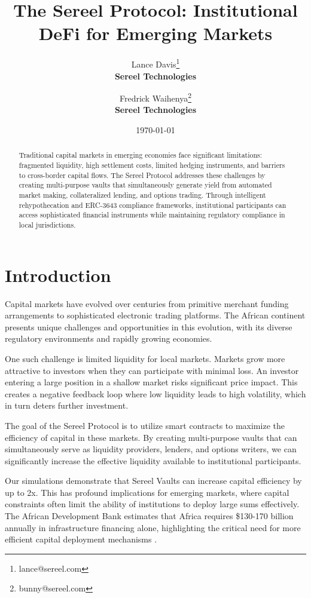 \documentclass[12pt]{article}
\title{The Sereel Protocol: Institutional DeFi for Emerging Markets}
\author{
Lance Davis\thanks{lance@sereel.com} \\ 
\textbf{\small Sereel Technologies}
\and
Fredrick Waihenya\thanks{bunny@sereel.com} \\
\textbf{\small Sereel Technologies}
}
\date{\today}
\begin{document}
\maketitle

\begin{abstract}
Traditional capital markets in emerging economies face significant limitations: fragmented liquidity, high settlement costs, limited hedging instruments, and barriers to cross-border capital flows. The Sereel Protocol addresses these challenges by creating multi-purpose vaults that simultaneously generate yield from automated market making, collateralized lending, and options trading. Through intelligent rehypothecation and ERC-3643 compliance frameworks, institutional participants can access sophisticated financial instruments while maintaining regulatory compliance in local jurisdictions.
\end{abstract}

\section{Introduction}

Capital markets have evolved over centuries from primitive merchant funding arrangements to sophisticated electronic trading platforms. The African continent presents unique challenges and opportunities in this evolution, with its diverse regulatory environments and rapidly growing economies.

One such challenge is limited liquidity for local markets. Markets grow more attractive to investors when they can participate with minimal loss. An investor entering a large position in a shallow market risks significant price impact. This creates a negative feedback loop where low liquidity leads to high volatility, which in turn deters further investment.

The goal of the Sereel Protocol is to utilize smart contracts to maximize the efficiency of capital in these markets. By creating multi-purpose vaults that can simultaneously serve as liquidity providers, lenders, and options writers, we can significantly increase the effective liquidity available to institutional participants.

Our simulations demonstrate that Sereel Vaults can increase capital efficiency by up to 2x. This has profound implications for emerging markets, where capital constraints often limit the ability of institutions to deploy large sums effectively. The African Development Bank estimates that Africa requires \$130-170 billion annually in infrastructure financing alone, highlighting the critical need for more efficient capital deployment mechanisms \citep{afdb2024scaling}.
\end{document}
